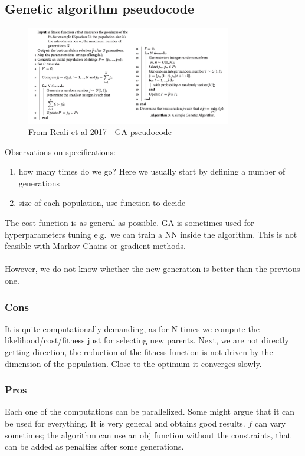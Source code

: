 \subsection{Genetic algorithm pseudocode}

\begin{figure}
\centering
\includegraphics[width=0.8\textwidth]{ga_algo.png}
\caption{From Reali et al 2017 - GA pseudocode}
\end{figure}

\noindent
Observations on specifications:

\begin{enumerate}
\def\labelenumi{\arabic{enumi}.}
\tightlist
\item
  how many times do we go? Here we usually start by defining a number of
  generations
\item
  size of each population, use function to decide
\end{enumerate}

The cost function is as general as possible. GA is sometimes used for
hyperparameters tuning e.g.~we can train a NN inside the algorithm. This
is not feasible with Markov Chains or gradient methods.
\\
\\
\noindent
However, we do not know whether the new generation is better than the
previous one.

\subsubsection{Cons}

It is quite computationally demanding, as for N times we compute the
likelihood/cost/fitness just for selecting new parents. Next, we are not
directly getting direction, the reduction of the fitness function is not
driven by the dimension of the population. Close to the optimum it
converges slowly.

\subsubsection{Pros}

Each one of the computations can be parallelized. Some might argue that
it can be used for everything. It is very general and obtains good
results. \(f\) can vary sometimes; the algorithm can use an obj function
without the constraints, that can be added as penalties after some
generations.
